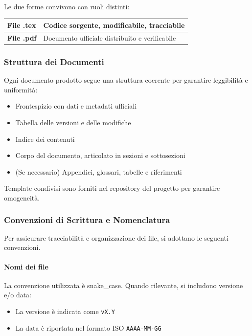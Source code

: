\documentclass[a4paper, 11pt, oneside]{scrartcl} %
\begin{document}
Le due forme convivono con ruoli distinti:

\begin{center}
\begin{tabular}{|l|l|}
\hline
\textbf{File .tex} & Codice sorgente, modificabile, tracciabile \\ \hline
\textbf{File .pdf} & Documento ufficiale distribuito e verificabile \\ \hline
\end{tabular}
\end{center}

\subsubsection{Struttura dei Documenti}
Ogni documento prodotto segue una struttura coerente per garantire leggibilità e uniformità:

\begin{itemize}
    \item Frontespizio{\scriptsize{}} con dati e metadati ufficiali
    \item Tabella delle versioni e delle modifiche
    \item Indice dei contenuti
    \item Corpo del documento, articolato in sezioni e sottosezioni
    \item (Se necessario) Appendici, glossari, tabelle e riferimenti
\end{itemize}

Template{\scriptsize{}} condivisi sono forniti nel repository del progetto per garantire omogeneità.
\subsubsection{Convenzioni di Scrittura e Nomenclatura}
Per assicurare tracciabilità e organizzazione dei file, si adottano le seguenti convenzioni.
\paragraph{Nomi dei file}
La convenzione utilizzata è snake\_case{\scriptsize{}}. Quando rilevante, si includono versione e/o data:

\begin{itemize}
    \item La versione è indicata come \texttt{vX.Y}
    \item La data è riportata nel formato ISO \texttt{AAAA-MM-GG}
\end{itemize}
\end{document}
